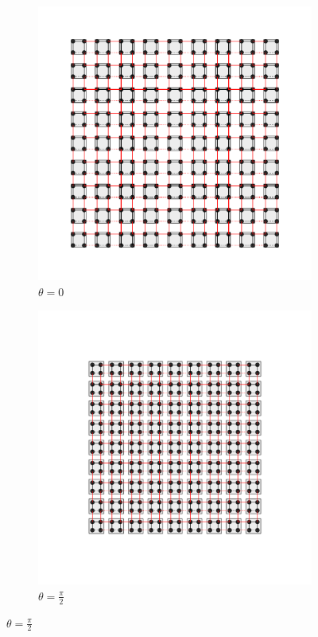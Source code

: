 \begin{figure}[thb!]
\begin{minipage}[h!]{0.9\textwidth}
\begin{subfigure}[b!]{0.2 \textwidth}
         \end{subfigure}\hspace*{-0.5em}
         \begin{subfigure}[b!]{0.2 \textwidth}
             \caption*{$\theta = 0$}
             \includegraphics[width=\textwidth]{Imagenes/Models/Model_pump/square_pump_model_xy_8.pdf}
         \end{subfigure}\hspace*{-0.5em}
         \begin{subfigure}[b!]{0.2 \textwidth}
             \caption*{$\theta = \frac{\pi}{2}$}
             \includegraphics[width=\textwidth]{Imagenes/Models/Model_pump/square_pump_model_xy_11.pdf}

\end{subfigure}
\end{minipage}
\end{figure}
